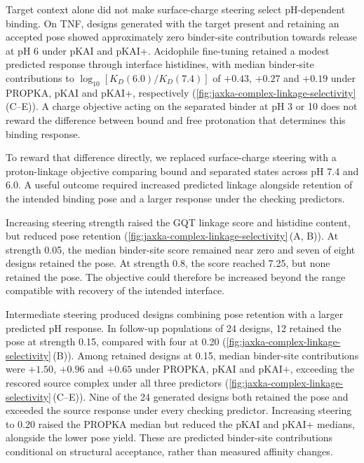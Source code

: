 Target context alone did not make surface-charge steering select pH-dependent binding. On TNF, designs generated with the target present and retaining an accepted pose showed approximately zero binder-site contribution towards release at pH 6 under pKAI and pKAI+. Acidophile fine-tuning retained a modest predicted response through interface histidines, with median binder-site contributions to $\log_{10}[K_D(6.0)/K_D(7.4)]$ of $+0.43$, $+0.27$ and $+0.19$ under PROPKA, pKAI and pKAI+, respectively (\cref{fig:jaxka-complex-linkage-selectivity}\,(C--E)). A charge objective acting on the separated binder at pH 3 or 10 does not reward the difference between bound and free protonation that determines this binding response.

To reward that difference directly, we replaced surface-charge steering with a proton-linkage objective comparing bound and separated states across pH 7.4 and 6.0. A useful outcome required increased predicted linkage alongside retention of the intended binding pose and a larger response under the checking predictors.

Increasing steering strength raised the GQT linkage score and histidine content, but reduced pose retention (\cref{fig:jaxka-complex-linkage-selectivity}\,(A, B)). At strength 0.05, the median binder-site score remained near zero and seven of eight designs retained the pose. At strength 0.8, the score reached 7.25, but none retained the pose. The objective could therefore be increased beyond the range compatible with recovery of the intended interface.

Intermediate steering produced designs combining pose retention with a larger predicted pH response. In follow-up populations of 24 designs, 12 retained the pose at strength 0.15, compared with four at 0.20 (\cref{fig:jaxka-complex-linkage-selectivity}\,(B)). Among retained designs at 0.15, median binder-site contributions were $+1.50$, $+0.96$ and $+0.65$ under PROPKA, pKAI and pKAI+, exceeding the rescored source complex under all three predictors (\cref{fig:jaxka-complex-linkage-selectivity}\,(C--E)). Nine of the 24 generated designs both retained the pose and exceeded the source response under every checking predictor. Increasing steering to 0.20 raised the PROPKA median but reduced the pKAI and pKAI+ medians, alongside the lower pose yield. These are predicted binder-site contributions conditional on structural acceptance, rather than measured affinity changes.

